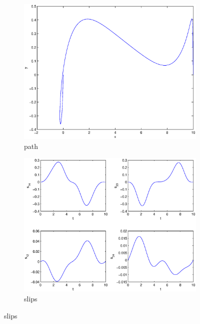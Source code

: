 \begin{figure}
\begin{subfigure}[b]{\textwidth}
\centering
\includegraphics[height=0.3\textheight]{img/final_15_1_10_path.eps}
\caption{path}
\end{subfigure}

\begin{subfigure}[b]{\textwidth}
\centering
\includegraphics[height=0.3\textheight]{img/final_15_1_10_slips.eps}
\caption{slips}
\end{subfigure}


\end{figure}

